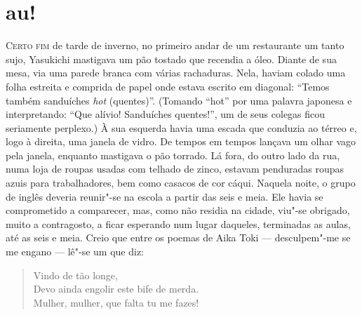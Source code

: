 \section*{au!}

\noindent\textsc{Certo fim} de tarde de inverno, no primeiro andar de um restaurante um
tanto sujo, Yasukichi mastigava um pão tostado que recendia a óleo.
Diante de sua mesa, via uma parede branca com várias rachaduras. Nela,
haviam colado uma folha estreita e comprida de papel onde estava
escrito em diagonal: ``Temos também sanduíches \textit{hot} (quentes)''.
(Tomando ``hot'' por uma palavra japonesa e interpretando: ``Que alívio!
Sanduíches quentes!'', um de seus colegas ficou seriamente perplexo.) À
sua esquerda havia uma escada que conduzia ao térreo e, logo à direita,
uma janela de vidro. De tempos em tempos lançava um olhar vago pela
janela, enquanto mastigava o pão torrado. Lá fora, do outro lado da
rua, numa loja de roupas usadas com telhado de zinco, estavam
penduradas roupas azuis para trabalhadores, bem como casacos de cor
cáqui. Naquela noite, o grupo de inglês deveria reunir"-se na escola a
partir das seis e meia. Ele havia se comprometido a comparecer,
mas, como não residia na cidade, viu"-se obrigado, muito a
contragosto, a ficar esperando num lugar daqueles, terminadas as aulas,
até as seis e meia. Creio que entre os poemas de Aika Toki --- 
desculpem"-me se me engano --- lê"-se um que diz:

\begin{verse}
Vindo de tão longe,\\
Devo ainda engolir este bife de merda.\\
Mulher, mulher, que falta tu me fazes!
\end{verse}

